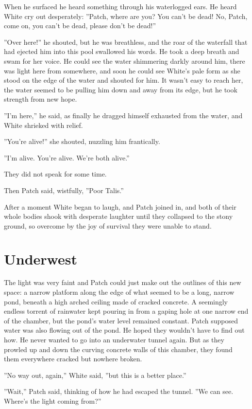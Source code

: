 \documentclass[12pt]{book}
\begin{document}
When he surfaced he heard something through his waterlogged ears. He heard White cry out desperately: ''Patch, where are you? You can't be dead! No, Patch, come on, you can't be dead, please don't be dead!''

''Over here!'' he shouted, but he was breathless, and the roar of the waterfall that had ejected him into this pool swallowed his words. He took a deep breath and swam for her voice. He could see the water shimmering darkly around him, there was light here from somewhere, and soon he could see White's pale form as she stood on the edge of the water and shouted for him. It wasn't easy to reach her, the water seemed to be pulling him down and away from its edge, but he took strength from new hope.

''I'm here,'' he said, as finally he dragged himself exhausted from the water, and White shrieked with relief.

''You're alive!'' she shouted, nuzzling him frantically.

''I'm alive. You're alive. We're both alive.''

They did not speak for some time.

Then Patch said, wistfully, ''Poor Talis.''

After a moment White began to laugh, and Patch joined in, and both of their whole bodies shook with desperate laughter until they collapsed to the stony ground, so overcome by the joy of survival they were unable to stand.


\section{Underwest}

The light was very faint and Patch could just make out the outlines of this new space: a narrow platform along the edge of what seemed to be a long, narrow pond, beneath a high arched ceiling made of cracked concrete. A seemingly endless torrent of rainwater kept pouring in from a gaping hole at one narrow end of the chamber, but the pond's water level remained constant. Patch supposed water was also flowing out of the pond. He hoped they wouldn't have to find out how. He never wanted to go into an underwater tunnel again. But as they prowled up and down the curving concrete walls of this chamber, they found them everywhere cracked but nowhere broken.

''No way out, again,'' White said, ''but this is a better place.''

''Wait,'' Patch said, thinking of how he had escaped the tunnel. ''We can see. Where's the light coming from?''
\end{document}
